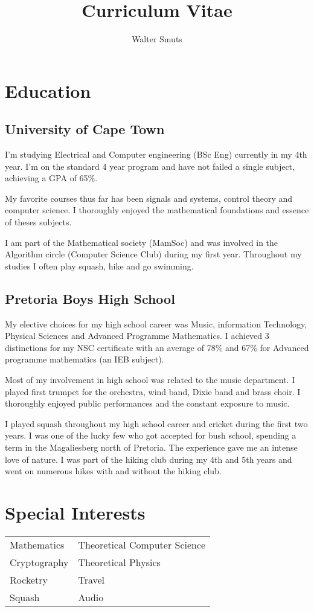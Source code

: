 \documentclass[twocolumn, 8pt]{extarticle}
\newcommand{\img}[1]{%
    \raisebox{-.3\baselineskip}{%
        \texttt{[image: \#1]}%
    }%
}
\begin{document}
\title{Curriculum Vitae}
\author{Walter Smuts}
\maketitle

\section{Education}

\subsection{University of Cape Town}
\img{UCT.jpg}
I’m studying Electrical and Computer engineering (BSc Eng)
currently in my 4th year. I’m on the standard 4 year
program and have not failed a single subject, achieving a
GPA of 65\%.

My favorite courses thus far has been signals and systems,
control theory and computer science. I thoroughly enjoyed
the mathematical foundations and essence of theses subjects.

I am part of the Mathematical society (MamSoc) and was
involved in the Algorithm circle (Computer Science Club)
during my first year. Throughout my studies I often play
squash, hike and go swimming.

\subsection{Pretoria Boys High School}
\img{PBHS.jpg}
My elective choices for my high school career was Music,
information Technology, Physical Sciences and Advanced
Programme Mathematics. I achieved 3 distinctions for my
NSC certificate with an average of 78\% and 67\% for
Advanced programme mathematics (an IEB subject).

Most of my involvement in high school was related to the
music department. I played first trumpet for the orchestra,
wind band, Dixie band and brass choir. I thoroughly enjoyed
public performances and the constant exposure to music.

I played squash throughout my high school career and
cricket during the first two years. I was one of the lucky few
who got accepted for bush school, spending a term in the
Magaliesberg north of Pretoria. The experience gave me an
intense love of nature. I was part of the hiking club during
my 4th and 5th years and went on numerous hikes with and
without the hiking club.

\section{Special Interests}
\begin{center}
\renewcommand{\arraystretch}{1.5}
\begin{tabular}{l l}
	Mathematics & Theoretical Computer Science \\
	Cryptography & Theoretical Physics \\
	Rocketry & Travel \\
	Squash & Audio \\
\end{tabular}
\end{center}
\end{document}
